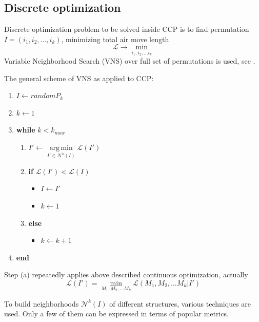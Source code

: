 \documentclass{ifacconf}
\DeclareMathOperator*{\argmin}{arg\,min}
\begin{document}
\subsection{Discrete optimization}

Discrete optimization problem
to be solved inside CCP
is to find permutation
$I=(i_1, i_2, \dots, i_k)$,
minimizing total air move length
$$
\mathcal L \to \min_{i_1, i_2, \dots i_k}
$$
Variable Neighborhood Search
(VNS)
over full set of permutations
is used,
see \cite{Hansen2010Mar}.

The general scheme of VNS as applied to CCP:
\begin{enumerate}
  \item $ I \gets random P_k$
  \item $ k \gets 1$
  \item \textbf{while} $k < k_{max}$
  \begin{enumerate}
  \item $ I' \gets \argmin\limits_{I' \in \mathcal N^k(I)} \mathcal L(I')$
  \item \textbf{if} $\mathcal L(I') < \mathcal L(I)$
  \begin{itemize}
      \item $I \gets I'$
      \item $ k \gets 1$
  \end{itemize}
  \item \textbf{else}
  \begin{itemize}
      \item $ k \gets k+1$
  \end{itemize}
  \end{enumerate}
  \item \textbf{end}
\end{enumerate}
Step (a) repeatedly applies
above described continuous
optimization,
actually
$$
\mathcal L(I') = \min_{M_1, M_2, \dots M_k} \mathcal L(M_1, M_2, \dots M_k | I')
$$

To build neighborhoods
$\mathcal N^k(I)$
of different structures,
various techniques are used.
Only a few of them
can be expressed in terms of
popular metrics.
\end{document}
